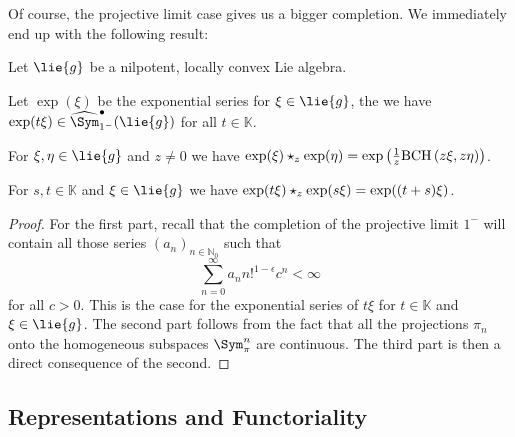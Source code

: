 Of course, the projective limit case gives us a bigger completion. We
immediately end up with the following result:
\begin{corollary}
    \label{corollary:NilpotentCase}%
    Let $\lie{g}$ be a nilpotent, locally convex Lie algebra.
    \begin{corollarylist}
    \item \label{item:NilpotentHasExp} 
    		Let $\exp(\xi)$ be the
        exponential series for $\xi \in \lie{g}$, the we have $\exp(t
        \xi) \in \widehat{\Sym}_{1^-}^\bullet(\lie{g})$ for all $t
        \in \mathbb{K}$.
    \item \label{item:NilpotentExpGivesBCH} 
    		For $\xi, \eta \in
        \lie{g}$ and $z \neq 0$ we have $\exp(\xi) \star_z
        \exp(\eta) = \exp \left(\frac 1 z \mathrm{BCH}\left(z \xi, z \eta\right)
        \right)$.
    \item \label{item:NipotentOneParameterGroups}
    		For $s,t \in
        \mathbb{K}$ and $\xi \in \lie{g}$ we have $\exp(t \xi)
        \star_z \exp(s \xi) = \exp ((t + s) \xi)$.
    \end{corollarylist}
\end{corollary}
\begin{proof}
    For the first part, recall that the completion of the projective
    limit $1^-$ will contain all those series $(a_n)_{n \in
      \mathbb{N}_0}$ such that
    \begin{equation*}
        \sum\limits_{n=0}^{\infty}
        a_n n!^{1 - \epsilon} c^n
        <
        \infty
    \end{equation*}
    for all $c > 0$.  This is the case for the exponential series of
    $t \xi$ for $t \in \mathbb{K}$ and $\xi \in \lie{g}$. The second
    part follows from the fact that all the projections $\pi_n$ onto
    the homogeneous subspaces $\Sym_{\pi}^n$ are continuous. The third
    part is then a direct consequence of the second.
\end{proof}


%
%

\subsection{Representations and Functoriality}
\label{subsec:NilpotentFunctorialityRepresentations}

